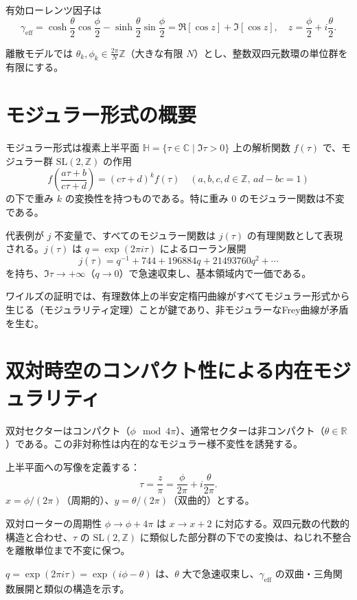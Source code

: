 \documentclass[dvipdfmx,a4paper]{article}
\begin{document}
有効ローレンツ因子は
\[
\gamma_\text{eff} = \cosh\!\frac{\theta}{2} \cos\!\frac{\phi}{2} - \sinh\!\frac{\theta}{2} \sin\!\frac{\phi}{2}
= \Re[\cos z] + \Im[\cos z], \quad z = \frac{\phi}{2} + i \frac{\theta}{2}.
\]

離散モデルでは $\theta_k, \phi_k \in \frac{2\pi}{N} \mathbb{Z}$（大きな有限 $N$）とし、整数双四元数環の単位群を有限にする。

\section{モジュラー形式の概要}

モジュラー形式は複素上半平面 $\mathbb{H} = \{\tau \in \mathbb{C} \mid \Im \tau > 0\}$ 上の解析関数 $f(\tau)$ で、モジュラー群 $\mathrm{SL}(2,\mathbb{Z})$ の作用
\[
f\left( \frac{a\tau + b}{c\tau + d} \right) = (c\tau + d)^{k} f(\tau) \quad (a,b,c,d \in \mathbb{Z}, \, ad-bc=1)
\]
の下で重み $k$ の変換性を持つものである。特に重み $0$ のモジュラー関数は不変である。

代表例が $j$ 不変量で、すべてのモジュラー関数は $j(\tau)$ の有理関数として表現される。$j(\tau)$ は $q = \exp(2\pi i \tau)$ によるローラン展開
\[
j(\tau) = q^{-1} + 744 + 196884 q + 21493760 q^2 + \cdots
\]
を持ち、$\Im \tau \to +\infty$（$q \to 0$）で急速収束し、基本領域内で一価である。

ワイルズの証明では、有理数体上の半安定楕円曲線がすべてモジュラー形式から生じる（モジュラリティ定理）ことが鍵であり、非モジュラーなFrey曲線が矛盾を生む。

\section{双対時空のコンパクト性による内在モジュラリティ}

双対セクターはコンパクト（$\phi \mod 4\pi$）、通常セクターは非コンパクト（$\theta \in \mathbb{R}$）である。この非対称性は内在的なモジュラー様不変性を誘発する。

上半平面への写像を定義する：
\[
\tau = \frac{z}{\pi} = \frac{\phi}{2\pi} + i \frac{\theta}{2\pi}.
\]
$x = \phi/(2\pi)$（周期的）、$y = \theta/(2\pi)$（双曲的）とする。

双対ローターの周期性 $\phi \to \phi + 4\pi$ は $x \to x + 2$ に対応する。双四元数の代数的構造と合わせ、$\tau$ の $\mathrm{SL}(2,\mathbb{Z})$ に類似した部分群の下での変換は、ねじれ不整合を離散単位まで不変に保つ。

$q = \exp(2\pi i \tau) = \exp(i \phi - \theta)$ は、$\theta$ 大で急速収束し、$\gamma_\text{eff}$ の双曲・三角関数展開と類似の構造を示す。
\end{document}
